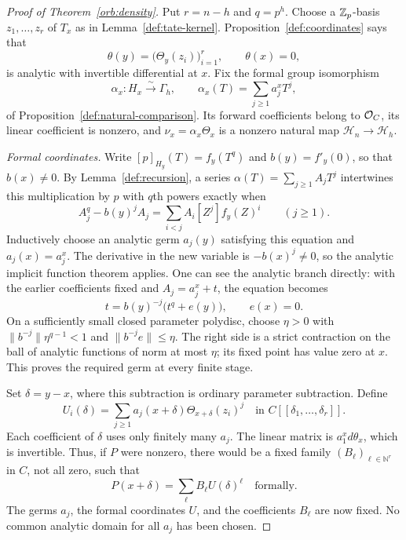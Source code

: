 \begin{proof}[Proof of Theorem~\ref{orb:density}]
Put $r=n-h$ and $q=p^h$.  Choose a $\mathbb Z_p$-basis
$z_1,\ldots,z_r$ of $T_x$ as in
Lemma~\ref{def:tate-kernel}.  Proposition~\ref{def:coordinates} says
that
\[
 \theta(y)=\bigl(\Theta_y(z_i)\bigr)_{i=1}^r,
 \qquad \theta(x)=0,
\]
is analytic with invertible differential at $x$.  Fix the formal group
isomorphism
\[
 \alpha_x:H_x\xrightarrow{\sim}\Gamma_h,
 \qquad \alpha_x(T)=\sum_{j\geq1}a_j^xT^j,
\]
of Proposition~\ref{def:natural-comparison}.  Its forward coefficients
belong to $\mathcal O_C$, its linear coefficient is nonzero, and
$\nu_x=\alpha_x\Theta_x$ is a nonzero natural map
$\mathcal H_n\to\mathcal H_h$.

\smallskip
\noindent\emph{Formal coordinates.}
Write $[p]_{H_y}(T)=f_y(T^q)$ and $b(y)=f'_y(0)$, so that
$b(x)\neq0$.  By Lemma~\ref{def:recursion}, a series
$\alpha(T)=\sum_{j\geq1}A_jT^j$ intertwines this multiplication by
$p$ with $q$th powers exactly when
\begin{equation}\label{orb:coefficient-germs}
 A_j^q-b(y)^jA_j
 =\sum_{i<j}A_i[Z^j]f_y(Z)^i
 \qquad(j\geq1).
\end{equation}
Inductively choose an analytic germ $a_j(y)$ satisfying this equation
and $a_j(x)=a_j^x$.  The derivative in the new variable is
$-b(x)^j\neq0$, so the analytic implicit function theorem applies.
One can see the analytic branch directly: with the earlier coefficients
fixed and $A_j=a_j^x+t$, the equation becomes
\[
 t=b(y)^{-j}\bigl(t^q+e(y)\bigr),\qquad e(x)=0.
\]
On a sufficiently small closed parameter polydisc, choose $\eta>0$
with $\|b^{-j}\|\eta^{q-1}<1$ and
$\|b^{-j}e\|\leq\eta$.  The right side is a strict contraction on
the ball of analytic functions of norm at most $\eta$; its fixed point
has value zero at $x$.  This proves the required germ at every finite
stage.

Set $\delta=y-x$, where this subtraction is ordinary parameter
subtraction.  Define
\[
 U_i(\delta)=\sum_{j\geq1}a_j(x+\delta)
                   \Theta_{x+\delta}(z_i)^j
 \quad\text{in }C[[\delta_1,\ldots,\delta_r]].
\]
Each coefficient of $\delta$ uses only finitely many $a_j$.
The linear matrix is $a_1^x d\theta_x$, which is invertible.
Thus, if $P$ were nonzero, there would be a fixed family
$(B_\ell)_{\ell\in\mathbb N^r}$ in $C$, not all zero, such that
\[
 P(x+\delta)=\sum_\ell B_\ell U(\delta)^\ell
 \quad\text{formally}.
\]
The germs $a_j$, the formal coordinates $U$, and the coefficients
$B_\ell$ are now fixed.  No common analytic domain for all $a_j$ has
been chosen.


\end{proof}
